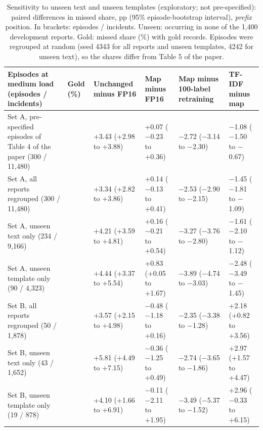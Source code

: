 \documentclass[10pt]{article}
\begin{document}
\begin{table}[!htbp]
\caption{Sensitivity to unseen text and unseen templates (exploratory;
not pre-specified): paired differences in missed share, pp (95\%
episode-bootstrap interval), \textit{prefix} position. In brackets:
episodes / incidents. Unseen: occurring in none of the 1,400 development
reports. Gold: missed share (\%) with gold records. Episodes were
regrouped at random (seed 4343 for all reports and unseen templates,
4242 for unseen text), so the shares differ from Table 5 of the paper.}
\label{tabS2}
\centering\footnotesize
\def\firstcol{0in}
\setlength{\tabcolsep}{3pt}\renewcommand{\arraystretch}{1.1}
\begin{tabular}{>{\raggedright\arraybackslash}p{}>{\raggedleft\arraybackslash}p{}>{\raggedleft\arraybackslash}p{}>{\raggedleft\arraybackslash}p{}>{\raggedleft\arraybackslash}p{}>{\raggedleft\arraybackslash}p{}}
\hline
\textbf{Episodes at medium load (episodes / incidents)} & \textbf{Gold (\%)} & \textbf{Unchanged minus FP16} & \textbf{Map minus FP16} & \textbf{Map minus 100-label retraining} & \textbf{TF-IDF minus map} \\
\hline
Set A, pre-specified episodes of Table 4 of the paper (300 / 11,480) & 5.71 & +3.43 (+2.98 to +3.88) & +0.07 ($-$0.23 to +0.36) & $-$2.72 ($-$3.14 to $-$2.30) & $-$1.08 ($-$1.50 to $-$0.67) \\
Set A, all reports regrouped (300 / 11,480) & 5.56 & +3.34 (+2.82 to +3.86) & +0.14 ($-$0.13 to +0.41) & $-$2.53 ($-$2.90 to $-$2.15) & $-$1.45 ($-$1.81 to $-$1.09) \\
Set A, unseen text only (234 / 9,166) & 6.35 & +4.21 (+3.59 to +4.81) & +0.16 ($-$0.21 to +0.54) & $-$3.27 ($-$3.76 to $-$2.80) & $-$1.61 ($-$2.10 to $-$1.12) \\
Set A, unseen template only (90 / 4,323) & 11.61 & +4.44 (+3.37 to +5.54) & +0.83 (+0.05 to +1.67) & $-$3.89 ($-$4.74 to $-$3.03) & $-$2.48 ($-$3.49 to $-$1.45) \\
Set B, all reports regrouped (50 / 1,878) & 5.32 & +3.57 (+2.15 to +4.98) & $-$0.48 ($-$1.18 to +0.16) & $-$2.35 ($-$3.38 to $-$1.28) & +2.18 (+0.82 to +3.56) \\
Set B, unseen text only (43 / 1,652) & 5.02 & +5.81 (+4.49 to +7.15) & $-$0.36 ($-$1.25 to +0.49) & $-$2.74 ($-$3.65 to $-$1.86) & +2.97 (+1.57 to +4.47) \\
Set B, unseen template only (19 / 878) & 10.71 & +4.10 (+1.66 to +6.91) & $-$0.11 ($-$2.11 to +1.95) & $-$3.49 ($-$5.37 to $-$1.52) & +2.96 ($-$0.33 to +6.15) \\
\hline
\end{tabular}
\end{table}
\end{document}
